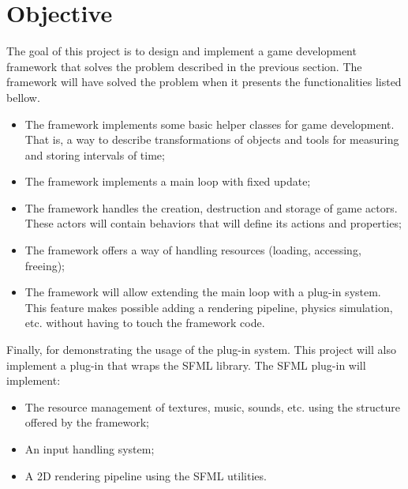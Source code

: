 \chapter{Objective}\label{ch:objective}

The goal of this project is to design and implement a game development framework that 
solves the problem described in the previous section. The framework will have solved 
the problem when it presents the functionalities listed bellow.

\begin{itemize}
\item The framework implements some basic helper classes for game development. That is, 
a way to describe transformations of objects and tools for measuring and storing intervals 
of time;
\item The framework implements a main loop with fixed update;
\item The framework handles the creation, destruction and storage of game actors. These 
actors will contain behaviors that will define its actions and properties;
\item The framework offers a way of handling resources (loading, accessing, freeing);
\item The framework will allow extending the main loop with a plug-in system. This feature 
makes possible adding a rendering pipeline, physics simulation, etc. without having 
to touch the framework code.
\end{itemize}

Finally, for demonstrating the usage of the plug-in system. This project will also 
implement a plug-in that wraps the SFML library. The SFML plug-in will implement:

\begin{itemize}
\item The resource management of textures, music, sounds, etc. using the structure offered 
by the framework;
\item An input handling system;
\item A 2D rendering pipeline using the SFML utilities.
\end{itemize}
